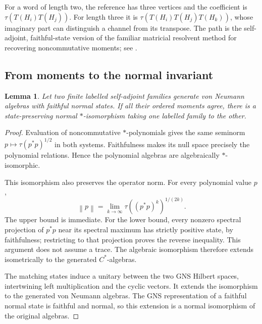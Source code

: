 \documentclass[11pt,reqno]{amsart}
\newtheorem{lemma}[theorem]{Lemma}
\theoremstyle{definition}
\theoremstyle{remark}
\numberwithin{equation}{section}
\newcommand{\norm}[1]{\left\lVert#1\right\rVert}
\begin{document}
For a word of length two, the reference has three vertices and the coefficient is $\tau(T(H_i)T(H_j))$. For length three it is $\tau(T(H_i)T(H_j)T(H_k))$, whose imaginary part can distinguish a channel from its transpose. The path is the self-adjoint, faithful-state version of the familiar matricial resolvent method for recovering noncommutative moments; see \cite{BPV}.

\subsection{From moments to the normal invariant}

\begin{lemma}\label{lem:moment-isomorphism}
Let two finite labelled self-adjoint families generate von Neumann algebras with faithful normal states. If all their ordered moments agree, there is a state-preserving normal $*$-isomorphism taking one labelled family to the other.
\end{lemma}

\begin{proof}
Evaluation of noncommutative $*$-polynomials gives the same seminorm $p\mapsto\tau(p^*p)^{1/2}$ in both systems. Faithfulness makes its null space precisely the polynomial relations. Hence the polynomial algebras are algebraically $*$-isomorphic.

This isomorphism also preserves the operator norm. For every polynomial value $p$,
\begin{equation}\label{eq:state-norm}
 \norm p=\lim_{k\to\infty}\tau((p^*p)^k)^{1/(2k)}.
\end{equation}
The upper bound is immediate. For the lower bound, every nonzero spectral projection of $p^*p$ near its spectral maximum has strictly positive state, by faithfulness; restricting to that projection proves the reverse inequality. This argument does not assume a trace. The algebraic isomorphism therefore extends isometrically to the generated $C^*$-algebras.

The matching states induce a unitary between the two GNS Hilbert spaces, intertwining left multiplication and the cyclic vectors. It extends the isomorphism to the generated von Neumann algebras. The GNS representation of a faithful normal state is faithful and normal, so this extension is a normal isomorphism of the original algebras.
\end{proof}
\end{document}
